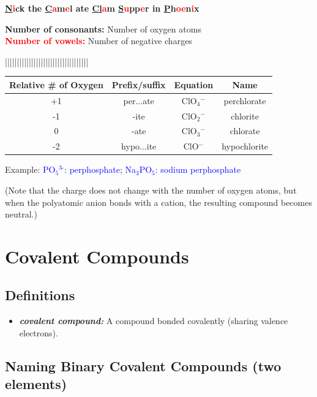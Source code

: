 \documentclass[a4paper, 12pt]{article}
\begin{document}
\noindent \textbf{\underline{N}\textcolor{red}{i}ck the \underline{C}\textcolor{red}{a}m\textcolor{red}{e}l ate \underline{Cl}\textcolor{red}{a}m \underline{S}\textcolor{red}{u}pp\textcolor{red}{e}r in \underline{P}h\textcolor{red}{oe}n\textcolor{red}{i}x}
 
\textbf{Number of consonants:} Number of oxygen atoms
\\
\textbf{\textcolor{red}{Number of vowels:}} Number of negative charges

\noindent |||||||||||||||||||||||||||||||||||
\begin{table}[ht]
    \centering
    \begin{tabular}{c|c|c|c}
         \textbf{Relative \# of Oxygen } & \textbf{Prefix/suffix} & \textbf{Equation} & \textbf{Name} \\\hline
        +1 & per...ate & ClO$_4$$^-$ & perchlorate \\
        -1 & -ite & ClO$_2$$^-$ & chlorite \\
        0 & -ate & ClO$_3$$^-$ & chlorate \\
        -2 & hypo...ite & ClO$^-$ & hypochlorite
    \end{tabular}
    \label{tab:my_label}
\end{table}

\noindent Example: \textcolor{blue}{PO$_5$$^{\text{3-}}$: perphosphate}; \textcolor{blue}{Na$_3$PO$_5$: sodium perphosphate}
 
(Note that the charge does not change with the number of oxygen atoms, but when the polyatomic anion bonds with a cation, the resulting compound becomes neutral.)

\section{Covalent Compounds}

\subsection*{Definitions}
\begin{itemize}[leftmargin=*,nosep]
    \item \textbf{\emph{covalent compound:}} A compound bonded covalently (sharing valence electrons).
\end{itemize}

\subsection*{Naming Binary Covalent Compounds (two elements)}
\fbox {\textbf{\textcolor{blue}{if $>$ 1, number prefix + first element + number prefix + second element + -ide}}} %
 
\end{document}
